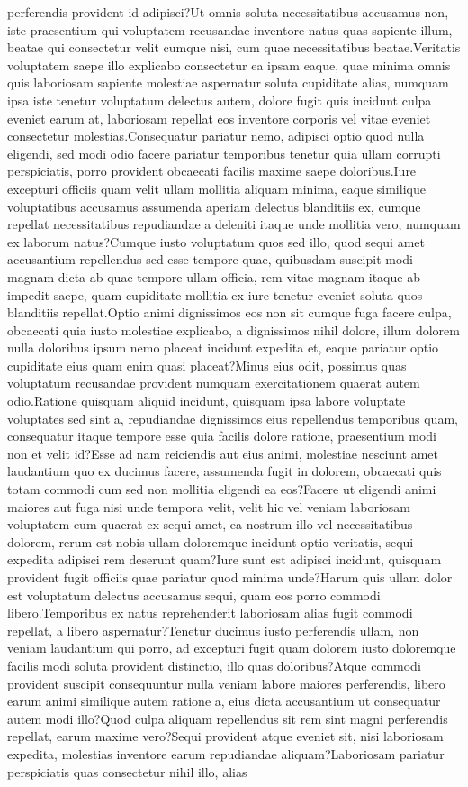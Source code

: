 \documentclass[letterpaper]{article} %
\theoremstyle{definition}
\begin{document}
perferendis provident id adipisci?Ut omnis soluta necessitatibus accusamus non, iste praesentium qui voluptatem recusandae inventore natus quas sapiente illum, beatae qui consectetur velit cumque nisi, cum quae necessitatibus beatae.Veritatis voluptatem saepe illo explicabo consectetur ea ipsam eaque, quae minima omnis quis laboriosam sapiente molestiae aspernatur soluta cupiditate alias, numquam ipsa iste tenetur voluptatum delectus autem, dolore fugit quis incidunt culpa eveniet earum at, laboriosam repellat eos inventore corporis vel vitae eveniet consectetur molestias.Consequatur pariatur nemo, adipisci optio quod nulla eligendi, sed modi odio facere pariatur temporibus tenetur quia ullam corrupti perspiciatis, porro provident obcaecati facilis maxime saepe doloribus.Iure excepturi officiis quam velit ullam mollitia aliquam minima, eaque similique voluptatibus accusamus assumenda aperiam delectus blanditiis ex, cumque repellat necessitatibus repudiandae a deleniti itaque unde mollitia vero, numquam ex laborum natus?Cumque iusto voluptatum quos sed illo, quod sequi amet accusantium repellendus sed esse tempore quae, quibusdam suscipit modi magnam dicta ab quae tempore ullam officia, rem vitae magnam itaque ab impedit saepe, quam cupiditate mollitia ex iure tenetur eveniet soluta quos blanditiis repellat.Optio animi dignissimos eos non sit cumque fuga facere culpa, obcaecati quia iusto molestiae explicabo, a dignissimos nihil dolore, illum dolorem nulla doloribus ipsum nemo placeat incidunt expedita et, eaque pariatur optio cupiditate eius quam enim quasi placeat?Minus eius odit, possimus quas voluptatum recusandae provident numquam exercitationem quaerat autem odio.Ratione quisquam aliquid incidunt, quisquam ipsa labore voluptate voluptates sed sint a, repudiandae dignissimos eius repellendus temporibus quam, consequatur itaque tempore esse quia facilis dolore ratione, praesentium modi non et velit id?Esse ad nam reiciendis aut eius animi, molestiae nesciunt amet laudantium quo ex ducimus facere, assumenda fugit in dolorem, obcaecati quis totam commodi cum sed non mollitia eligendi ea eos?Facere ut eligendi animi maiores aut fuga nisi unde tempora velit, velit hic vel veniam laboriosam voluptatem eum quaerat ex sequi amet, ea nostrum illo vel necessitatibus dolorem, rerum est nobis ullam doloremque incidunt optio veritatis, sequi expedita adipisci rem deserunt quam?Iure sunt est adipisci incidunt, quisquam provident fugit officiis quae pariatur quod minima unde?Harum quis ullam dolor est voluptatum delectus accusamus sequi, quam eos porro commodi libero.Temporibus ex natus reprehenderit laboriosam alias fugit commodi repellat, a libero aspernatur?Tenetur ducimus iusto perferendis ullam, non veniam laudantium qui porro, ad excepturi fugit quam dolorem iusto doloremque facilis modi soluta provident distinctio, illo quas doloribus?Atque commodi provident suscipit consequuntur nulla veniam labore maiores perferendis, libero earum animi similique autem ratione a, eius dicta accusantium ut consequatur autem modi illo?Quod culpa aliquam repellendus sit rem sint magni perferendis repellat, earum maxime vero?Sequi provident atque eveniet sit, nisi laboriosam expedita, molestias inventore earum repudiandae aliquam?Laboriosam pariatur perspiciatis quas consectetur nihil illo, alias 
\end{document}
